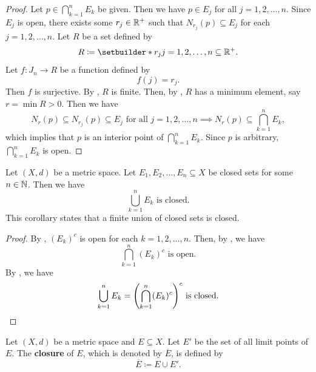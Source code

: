 \begin{proof}
    Let $p \in \displaystyle \bigcap_{k = 1}^{n} E_{k}$ be given. Then we have $p \in E_{j}$ for all $j = 1, 2, \dots, n$.
    Since $E_{j}$ is open, there exists some $r_{j} \in \mathbb{R}^{+}$ such that $N_{r_{j}}(p) \subseteq E_{j}$ for each $j = 
    1, 2, \dots, n$. Let $R$ be a set defined by
    \[
    R \coloneqq \setbuilder*{r_{j}}{j = 1, 2, \dots, n} \subseteq \R^{+}.
    \]
    Let $f: J_{n} \to R$ be a function defined by
    \[
    f(j) = r_{j}.
    \]
    Then $f$ is surjective. By , $R$ is finite.
    Then, by , $R$ has a minimum element, say $r = \min R > 0$. Then we have
    \[
    N_{r}(p) \subseteq N_{r_{j}}(p) \subseteq E_{j} \text{ for all } j = 1, 2, \dots, n
    \implies N_{r}(p) \subseteq \bigcap_{k = 1}^{n} E_{k},
    \]
    which implies that $p$ is an interior point of $\displaystyle \bigcap_{k = 1}^{n} E_{k}$.
    Since $p$ is arbitrary, $\displaystyle \bigcap_{k = 1}^{n} E_{k}$ is open.
\end{proof}

\bigskip

\begin{corollary} \label{cor:FiniteUnionOfClosedSetsIsClosed}
    Let $(X, d)$ be a metric space. Let $E_{1}, E_{2}, \dots, E_{n} \subseteq X$
    be closed sets for some $n \in \mathbb{N}$. Then we have
    \[
    \bigcup_{k = 1}^{n} E_{k} \text{ is closed.}
    \]
    This corollary states that a finite union of closed sets is closed.
\end{corollary}

\begin{proof}
    By , $(E_{k})^{c}$ is open for each $k = 1, 2, \dots, n$.
    Then, by , we have
    \[
    \bigcap_{k = 1}^{n} (E_{k})^{c} \text{ is open.}
    \]
    By , we have
    \[
    \bigcup_{k = 1}^{n} E_{k} = \paren*{\bigcap_{k = 1}^{n} (E_{k})^{c}}^{c} \text{ is closed.}
    \]
\end{proof}

\bigskip

\begin{definition} \label{def:Closure}
    Let $(X, d)$ be a metric space and $E \subseteq X$. Let $E'$ be the set of all limit points of $E$.    
    The \textbf{closure} of $E$, which is denoted by $\overline{E}$, is defined by
    \[
    \overline{E} \coloneqq E \cup E'.
    \]
\end{definition}

